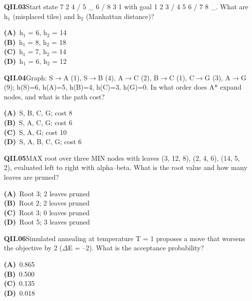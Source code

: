 \documentclass[11pt]{article}
\begin{document}
\begin{tcolorbox}[enhanced,breakable,colback=white,colframe=navyL,arc=2mm,boxrule=0.7pt,left=3mm,right=3mm,top=2mm,bottom=2mm]
\textbf{\color{navy}QII.03}\quad Start state 7 2 4 / 5 \_ 6 / 8 3 1 with goal 1 2 3 / 4 5 6 / 7 8 \_. What are h$_1$ (misplaced tiles) and h$_2$ (Manhattan distance)?\hfill{}\par\smallskip
{\small \textbf{\color{navyL}(A)}\ h$_1$ = 6, h$_2$ = 14\\[1pt]\textbf{\color{navyL}(B)}\ h$_1$ = 8, h$_2$ = 18\\[1pt]\textbf{\color{navyL}(C)}\ h$_1$ = 7, h$_2$ = 14\\[1pt]\textbf{\color{navyL}(D)}\ h$_1$ = 6, h$_2$ = 12}
\end{tcolorbox}
\begin{tcolorbox}[enhanced,breakable,colback=white,colframe=navyL,arc=2mm,boxrule=0.7pt,left=3mm,right=3mm,top=2mm,bottom=2mm]
\textbf{\color{navy}QII.04}\quad Graph: S$\to$A (1), S$\to$B (4), A$\to$C (2), B$\to$C (1), C$\to$G (3), A$\to$G (9); h(S)=6, h(A)=5, h(B)=4, h(C)=3, h(G)=0. In what order does A* expand nodes, and what is the path cost?\hfill{}\par\smallskip
{\small \textbf{\color{navyL}(A)}\ S, B, C, G; cost 8\\[1pt]\textbf{\color{navyL}(B)}\ S, A, C, G; cost 6\\[1pt]\textbf{\color{navyL}(C)}\ S, A, G; cost 10\\[1pt]\textbf{\color{navyL}(D)}\ S, A, B, C, G; cost 6}
\end{tcolorbox}
\begin{tcolorbox}[enhanced,breakable,colback=white,colframe=navyL,arc=2mm,boxrule=0.7pt,left=3mm,right=3mm,top=2mm,bottom=2mm]
\textbf{\color{navy}QII.05}\quad MAX root over three MIN nodes with leaves (3, 12, 8), (2, 4, 6), (14, 5, 2), evaluated left to right with alpha--beta. What is the root value and how many leaves are pruned?\hfill{}\par\smallskip
{\small \textbf{\color{navyL}(A)}\ Root 3; 2 leaves pruned\\[1pt]\textbf{\color{navyL}(B)}\ Root 2; 2 leaves pruned\\[1pt]\textbf{\color{navyL}(C)}\ Root 3; 0 leaves pruned\\[1pt]\textbf{\color{navyL}(D)}\ Root 5; 3 leaves pruned}
\end{tcolorbox}
\begin{tcolorbox}[enhanced,breakable,colback=white,colframe=navyL,arc=2mm,boxrule=0.7pt,left=3mm,right=3mm,top=2mm,bottom=2mm]
\textbf{\color{navy}QII.06}\quad Simulated annealing at temperature T = 1 proposes a move that worsens the objective by 2 ($\Delta$E = --2). What is the acceptance probability?\hfill{}\par\smallskip
{\small \textbf{\color{navyL}(A)}\ 0.865\\[1pt]\textbf{\color{navyL}(B)}\ 0.500\\[1pt]\textbf{\color{navyL}(C)}\ 0.135\\[1pt]\textbf{\color{navyL}(D)}\ 0.018}
\end{tcolorbox}
\end{document}
